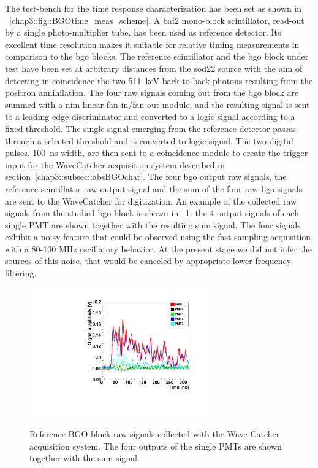The test-bench for the time response characterization has been set as shown in \figurename~\ref{chap3::fig::BGOtime_meas_scheme}. A \gls{baf2} mono-block scintillator, read-out by a single photo-multiplier tube, has been used as reference detector. Its excellent time resolution makes it suitable for relative timing measurements in comparison to the \gls{bgo} blocks. The reference scintillator and the \gls{bgo} block under test have been set at arbitrary distances from the \gls{sod22} source with the aim of detecting in coincidence the two 511~keV back-to-back photons resulting from the positron annihilation. The four raw signals coming out from the \gls{bgo} block are summed with a \gls{nim} linear fan-in/fan-out module, and the resulting signal is sent to a leading edge discriminator and converted to a logic signal according to a fixed threshold. The single signal emerging from the reference detector passes through a selected threshold and is converted to logic signal. The two digital pulses, 100~ns width, are then sent to a coincidence module to create the trigger input for the WaveCatcher acquisition system described in section~\ref{chap3::subsec::absBGOchar}. The four \gls{bgo} output raw signals, the reference scintillator raw output signal and the sum of the four raw \gls{bgo} signals are sent to the WaveCatcher for digitization. An example of the collected raw signals from the studied \gls{bgo} block is shown in \figurename~\ref{chap3::fig::raw_signal}: the 4 output signals of each single PMT are shown together with the resulting sum signal. The four signals exhibit a noisy feature that could be observed using the fast sampling acquisition, with a 80-100 MHz oscillatory behavior. At the present stage we did not infer the
sources of this noise, that would be canceled by appropriate lower frequency filtering.

\begin{figure} [!h]
\centering
{\includegraphics[width=0.7\textwidth]{03_GraphicFiles/chapter3_CLaRySproto/Absorber/images/raw_signalExample.pdf}}
\caption{Reference BGO block raw signals collected with the Wave Catcher acquisition system. The four outputs of the single PMTs are shown together with the sum signal.}
\label{chap3::fig::raw_signal}
\end{figure}

